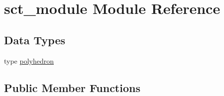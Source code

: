 \hypertarget{classsct__module}{\section{sct\-\_\-module Module Reference}
\label{classsct__module}
}
\subsection*{Data Types}
\begin{DoxyCompactItemize}
\item 
type \hyperlink{structsct__module_1_1polyhedron}{polyhedron}
\end{DoxyCompactItemize}
\subsection*{Public Member Functions}
